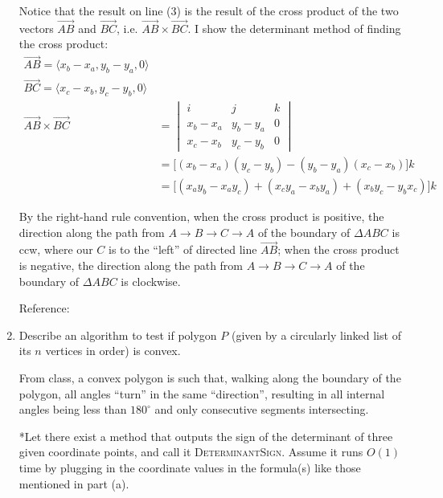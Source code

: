 \documentclass [12pt]{article}
\begin{document}
\begin{enumerate}[label=(\alph*)]
            Notice that the result on line (3) is the result of the cross product of the two vectors $\overrightarrow{AB}$ and $\overrightarrow{BC}$, i.e. $\overrightarrow{AB} \times \overrightarrow{BC}$. I show the determinant method of finding the cross product:
            \begin{align*}
                \overrightarrow{AB} = \langle x_b - x_a, y_b - y_a, 0 \rangle \\ 
                \overrightarrow{BC} = \langle x_c - x_b, y_c - y_b, 0 \rangle \\ 
                \overrightarrow{AB} \times \overrightarrow{BC} &= 
                \begin{vmatrix}
                    i & j & k \\
                    x_b - x_a & y_b - y_a & 0 \\ 
                    x_c - x_b & y_c - y_b & 0
                \end{vmatrix} \\
                &= \big[(x_b - x_a)(y_c - y_b) - (y_b - y_a)(x_c - x_b)\big] k \\ 
                &= \big[(x_a y_b - x_a y_c) + (x_c y_a - x_b y_a) + (x_b y_c - y_b x_c)\big] k
            \end{align*}
            
            
            By the right-hand rule convention, when the cross product is positive, the direction along the path from $A \rightarrow B \rightarrow C \rightarrow A$ of the boundary of $\Delta ABC$ is ccw, where our $C$ is to the ``left'' of directed line $\overrightarrow{AB}$; when the cross product is negative, the direction along the path from $A \rightarrow B \rightarrow C \rightarrow A$ of the boundary of $\Delta ABC$ is clockwise. 

            Reference: \cite{crossprod2vec} \cite{mathcurvorien}

            \item Describe an algorithm to test if polygon $P$ (given by a circularly linked list of its $n$ vertices in order) is convex. 
            
            From class, a convex polygon is such that, walking along the boundary of the polygon, all angles ``turn'' in the same ``direction'', resulting in all internal angles being less than $180^\circ$ and only consecutive segments intersecting.
            
            *Let there exist a method that outputs the sign of the determinant of three given coordinate points, and call it \textsc{DeterminantSign}. Assume it runs $O(1)$ time by plugging in the coordinate values in the formula(s) like those mentioned in part (a).
             

\end{enumerate}
\end{document}
